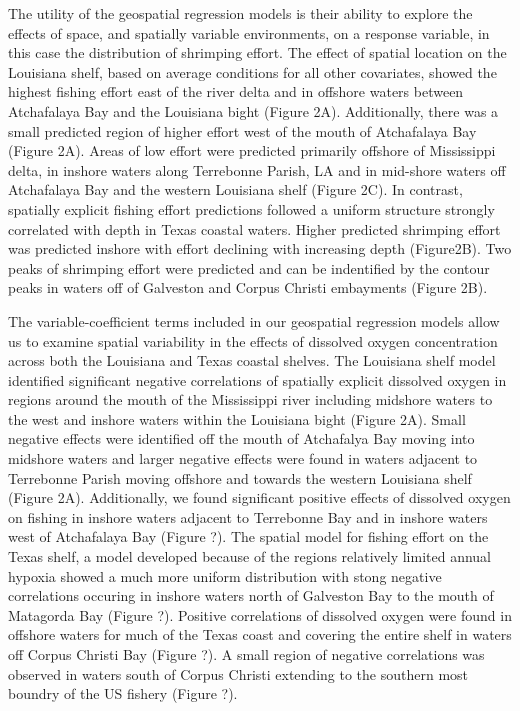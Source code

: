 \documentclass[10pt]{article}
\begin{document}
The utility of the geospatial regression models is their ability to explore the effects of space, and spatially variable environments, on a response variable, in this case the distribution of shrimping effort.  The effect of spatial location on the Louisiana shelf, based on average conditions for all other covariates, showed the highest fishing effort east of the river delta and in offshore waters between Atchafalaya Bay and the Louisiana bight (Figure 2A).  Additionally, there was a small predicted region of higher effort west of the mouth of Atchafalaya Bay (Figure 2A).  Areas of low effort were predicted primarily offshore of Mississippi delta, in inshore waters along Terrebonne Parish, LA and in mid-shore waters off Atchafalaya Bay and the western Louisiana shelf (Figure 2C).  In contrast, spatially explicit fishing effort predictions followed a uniform structure strongly correlated with depth in Texas coastal waters.  Higher predicted shrimping effort was predicted inshore with effort declining with increasing depth (Figure2B).  Two peaks of shrimping effort were predicted and can be indentified by the contour peaks in waters off of Galveston and Corpus Christi embayments (Figure 2B).  

The variable-coefficient terms included in our geospatial regression models allow us to examine spatial variability in the effects of dissolved oxygen concentration across both the Louisiana and Texas coastal shelves.  The Louisiana shelf model identified significant negative correlations of spatially explicit dissolved oxygen in regions around the mouth of the Mississippi river including midshore waters to the west and inshore waters within the Louisiana bight (Figure 2A).  Small negative effects were identified off the mouth of Atchafalya Bay moving into midshore waters and larger negative effects were found in waters adjacent to Terrebonne Parish moving offshore and towards the western Louisiana shelf (Figure 2A). Additionally, we found significant positive effects of dissolved oxygen on fishing in inshore waters adjacent to Terrebonne Bay and in inshore waters west of Atchafalaya Bay (Figure ?). The spatial model for fishing effort on the Texas shelf, a model developed because of the regions relatively limited annual hypoxia showed a much more uniform distribution with stong negative correlations occuring in inshore waters  north of Galveston Bay to the mouth of Matagorda Bay (Figure ?).  Positive correlations of dissolved oxygen were found in offshore waters for much of the Texas coast and covering the entire shelf in waters off Corpus Christi Bay (Figure ?).  A small region of negative correlations was observed in waters south of Corpus Christi extending to the southern most boundry of the US fishery (Figure ?).  
 
\end{document}
